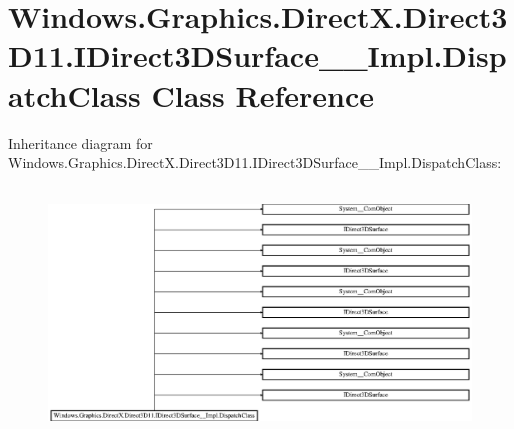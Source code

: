 \hypertarget{class_windows_1_1_graphics_1_1_direct_x_1_1_direct3_d11_1_1_i_direct3_d_surface_____impl_1_1_dispatch_class}{}\section{Windows.\+Graphics.\+Direct\+X.\+Direct3\+D11.\+I\+Direct3\+D\+Surface\+\_\+\+\_\+\+Impl.\+Dispatch\+Class Class Reference}
\label{class_windows_1_1_graphics_1_1_direct_x_1_1_direct3_d11_1_1_i_direct3_d_surface_____impl_1_1_dispatch_class}
Inheritance diagram for Windows.\+Graphics.\+Direct\+X.\+Direct3\+D11.\+I\+Direct3\+D\+Surface\+\_\+\+\_\+\+Impl.\+Dispatch\+Class\+:\begin{figure}[H]
\begin{center}
\leavevmode
\includegraphics[height=6.666667cm]{class_windows_1_1_graphics_1_1_direct_x_1_1_direct3_d11_1_1_i_direct3_d_surface_____impl_1_1_dispatch_class}
\end{center}
\end{figure}
